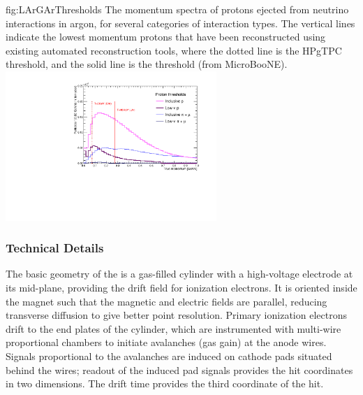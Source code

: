 \begin{dunefigure}{fig:LArGArThresholds}
{The momentum spectra of protons ejected from neutrino interactions in argon, for several categories of interaction types. The vertical lines indicate the lowest momentum protons that have been reconstructed using existing automated reconstruction tools, where the dotted line is the HPgTPC threshold, and the solid line is the  threshold (from MicroBooNE).}
    \includegraphics[width=0.6\textwidth]{graphics/Threshold.pdf}
\end{dunefigure}


\subsubsection{ Technical Details}
The basic geometry of the  is a gas-filled cylinder with a high-voltage electrode at its mid-plane, providing the drift field for ionization electrons. It is oriented inside the magnet such that the magnetic and electric fields are parallel, reducing transverse diffusion to give better point resolution. Primary ionization electrons drift to the end plates of the cylinder, which are instrumented with multi-wire proportional chambers to initiate avalanches (gas gain) at the anode wires.  Signals proportional to the avalanches are induced on cathode pads situated behind the wires; readout of the induced pad signals provides the hit coordinates in two dimensions.  The drift time provides the third coordinate of the hit.

